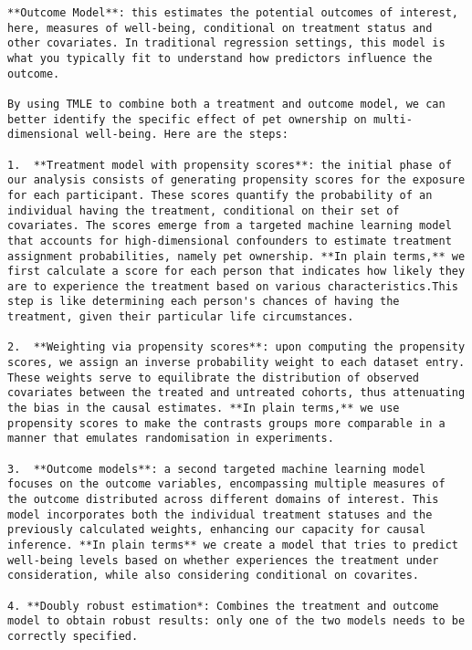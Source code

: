 \documentclass[
  singlecolumn]{article}
\begin{document}
\begin{verbatim}
**Outcome Model**: this estimates the potential outcomes of interest, here, measures of well-being, conditional on treatment status and other covariates. In traditional regression settings, this model is what you typically fit to understand how predictors influence the outcome.

By using TMLE to combine both a treatment and outcome model, we can better identify the specific effect of pet ownership on multi-dimensional well-being. Here are the steps:

1.  **Treatment model with propensity scores**: the initial phase of our analysis consists of generating propensity scores for the exposure for each participant. These scores quantify the probability of an individual having the treatment, conditional on their set of covariates. The scores emerge from a targeted machine learning model that accounts for high-dimensional confounders to estimate treatment assignment probabilities, namely pet ownership. **In plain terms,** we first calculate a score for each person that indicates how likely they are to experience the treatment based on various characteristics.This step is like determining each person's chances of having the treatment, given their particular life circumstances.

2.  **Weighting via propensity scores**: upon computing the propensity scores, we assign an inverse probability weight to each dataset entry. These weights serve to equilibrate the distribution of observed covariates between the treated and untreated cohorts, thus attenuating the bias in the causal estimates. **In plain terms,** we use propensity scores to make the contrasts groups more comparable in a manner that emulates randomisation in experiments.

3.  **Outcome models**: a second targeted machine learning model focuses on the outcome variables, encompassing multiple measures of the outcome distributed across different domains of interest. This model incorporates both the individual treatment statuses and the previously calculated weights, enhancing our capacity for causal inference. **In plain terms** we create a model that tries to predict well-being levels based on whether experiences the treatment under consideration, while also considering conditional on covarites.

4. **Doubly robust estimation*: Combines the treatment and outcome model to obtain robust results: only one of the two models needs to be correctly specified.


\end{verbatim}
\end{document}
